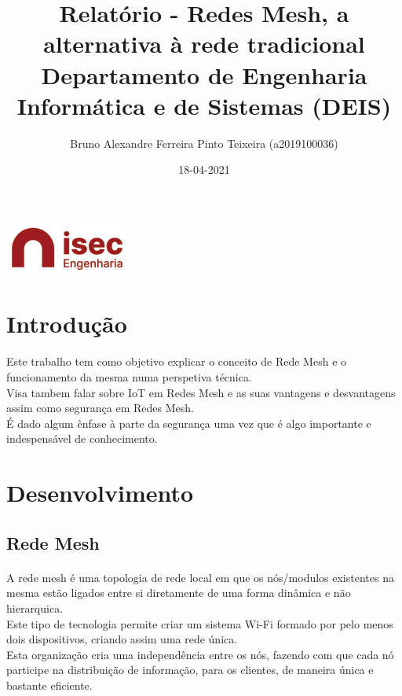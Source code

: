 \documentclass[letterpaper, 11pt]{article}
\author{Bruno Alexandre Ferreira Pinto Teixeira (a2019100036)}
\date{18-04-2021}
\title{Relatório - Redes Mesh, a alternativa à rede tradicional\\\medskip
\large Departamento de Engenharia Informática e de Sistemas (DEIS)}
\begin{document}
\maketitle
\begin{center}
\includegraphics[width=5 cm]{imagens/isec.png}
\end{center}

\clearpage
\tableofcontents
\clearpage
\listoffigures
\clearpage

\section{Introdução}
\label{sec:orgd2ca37c}

\paragraph{}
Este trabalho tem como objetivo explicar o conceito de Rede Mesh e o funcionamento da mesma numa perspetiva técnica.\\
Visa tambem falar sobre IoT em Redes Mesh e as suas vantagens e desvantagens assim como segurança em Redes Mesh.\\
É dado algum ênfase à parte da segurança uma vez que é algo importante e indespensável de conhecimento.

\clearpage

\section{Desenvolvimento}
\label{sec:org94d8e41}
\subsection{Rede Mesh}
\label{sec:orga207771}

\paragraph{}
A rede mesh é uma topologia de rede local em que os nós/modulos existentes na mesma estão ligados entre si diretamente de uma forma dinâmica e não hierarquica.\\
Este tipo de tecnologia permite criar um sistema Wi-Fi formado por pelo menos dois dispositivos,
criando assim uma rede única.\\
Esta organização cria uma independência entre os nós, fazendo com que cada nó participe na
distribuição de informação, para os clientes, de maneira única e bastante eficiente.
\end{document}
